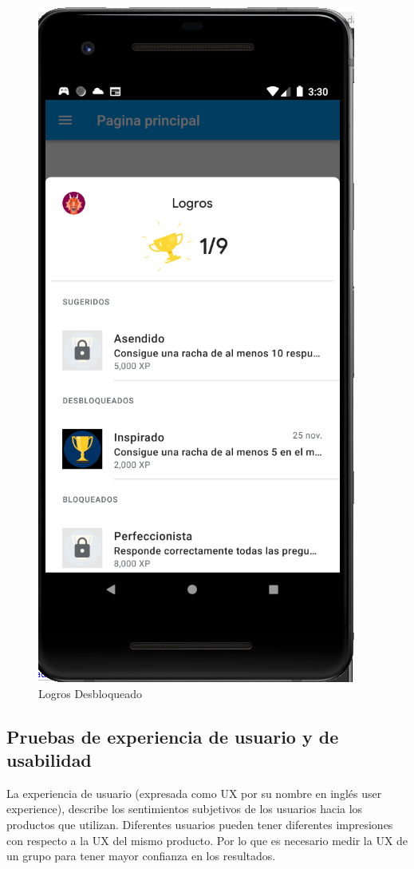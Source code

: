 \documentclass{article}
\begin{document}
\begin{figure}[H]
    \centering
    \includegraphics[scale=0.8]{imgs/Test/LogroDes2}
    \caption{Logros Desbloqueado}
\end{figure}

\subsection{Pruebas de experiencia de usuario y de usabilidad}
La experiencia de usuario (expresada como UX por su nombre en inglés user experience), 
describe los sentimientos subjetivos de los usuarios hacia los productos que utilizan. 
Diferentes usuarios pueden tener diferentes impresiones con respecto a la UX del mismo 
producto. Por lo que es necesario medir la UX de un grupo para tener mayor confianza 
en los resultados\cite{santoso2016measuring}.
\end{document}
